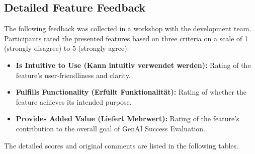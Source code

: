 \documentclass[
	english,
	ruledheaders=section,%
	class=report,%
	thesis={type=bachelor},%
	accentcolor=1b,%
	custommargins=true,%
	marginpar=false,%
	parskip=half-,%
	fontsize=11pt,%
	DIV=14,
]{tudapub}
\begin{document}
\subsection{Detailed Feature Feedback}

The following feedback was collected in a workshop with the development team. Participants rated the presented features based on three criteria on a scale of 1 (strongly disagree) to 5 (strongly agree):
\begin{itemize}
    \item \textbf{Is Intuitive to Use (Kann intuitiv verwendet werden):} Rating of the feature's user-friendliness and clarity.
    \item \textbf{Fulfills Functionality (Erfüllt Funktionalität):} Rating of whether the feature achieves its intended purpose.
    \item \textbf{Provides Added Value (Liefert Mehrwert):} Rating of the feature's contribution to the overall goal of GenAI Success Evaluation.
\end{itemize}

The detailed scores and original comments are listed in the following tables.
\end{document}
